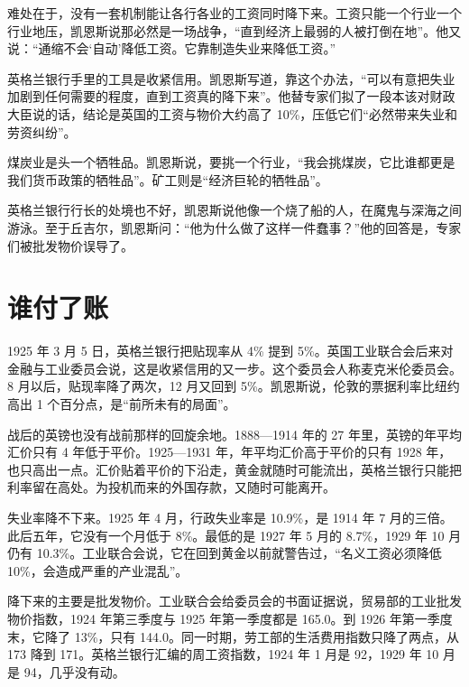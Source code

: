 难处在于，没有一套机制能让各行各业的工资同时降下来\cite{keynes1925}。工资只能一个行业一个行业地压，凯恩斯说那必然是一场战争，“直到经济上最弱的人被打倒在地”\cite{keynes1925}。他又说：“通缩不会‘自动’降低工资。它靠制造失业来降低工资。”\cite{keynes1925}

英格兰银行手里的工具是收紧信用。凯恩斯写道，靠这个办法，“可以有意把失业加剧到任何需要的程度，直到工资真的降下来”\cite{keynes1925}。他替专家们拟了一段本该对财政大臣说的话，结论是英国的工资与物价大约高了 10\%，压低它们“必然带来失业和劳资纠纷”\cite{keynes1925}。

煤炭业是头一个牺牲品。凯恩斯说，要挑一个行业，“我会挑煤炭，它比谁都更是我们货币政策的牺牲品”\cite{keynes1925}。矿工则是“经济巨轮的牺牲品”\cite{keynes1925}。

英格兰银行行长的处境也不好，凯恩斯说他像一个烧了船的人，在魔鬼与深海之间游泳\cite{keynes1925}。至于丘吉尔，凯恩斯问：“他为什么做了这样一件蠢事？”他的回答是，专家们被批发物价误导了\cite{keynes1925}。

\section{谁付了账}\label{sec:interwar-cost}

1925 年 3 月 5 日，英格兰银行把贴现率从 4\% 提到 5\%\cite{boe2017}。英国工业联合会后来对金融与工业委员会说，这是收紧信用的又一步\cite{macmillan1931}。这个委员会人称麦克米伦委员会。8 月以后，贴现率降了两次，12 月又回到 5\%\cite{boe2017}。凯恩斯说，伦敦的票据利率比纽约高出 1 个百分点，是“前所未有的局面”\cite{keynes1925}。

战后的英镑也没有战前那样的回旋余地。1888—1914 年的 27 年里，英镑的年平均汇价只有 4 年低于平价\cite{brown1940}。1925—1931 年，年平均汇价高于平价的只有 1928 年，也只高出一点\cite{brown1940}。汇价贴着平价的下沿走，黄金就随时可能流出，英格兰银行只能把利率留在高处。为投机而来的外国存款，又随时可能离开\cite{hansardlords1925}。

失业率降不下来。1925 年 4 月，行政失业率是 10.9\%，是 1914 年 7 月的三倍\cite{boe2017}。此后五年，它没有一个月低于 8\%。最低的是 1927 年 5 月的 8.7\%，1929 年 10 月仍有 10.3\%\cite{boe2017}。工业联合会说，它在回到黄金以前就警告过，“名义工资必须降低 10\%，会造成严重的产业混乱”\cite{macmillan1931}。

降下来的主要是批发物价。工业联合会给委员会的书面证据说，贸易部的工业批发物价指数，1924 年第三季度与 1925 年第一季度都是 165.0。到 1926 年第一季度末，它降了 13\%，只有 144.0\cite{macmillan1931}。同一时期，劳工部的生活费用指数只降了两点，从 173 降到 171\cite{macmillan1931}。英格兰银行汇编的周工资指数，1924 年 1 月是 92，1929 年 10 月是 94，几乎没有动\cite{boe2017}。

